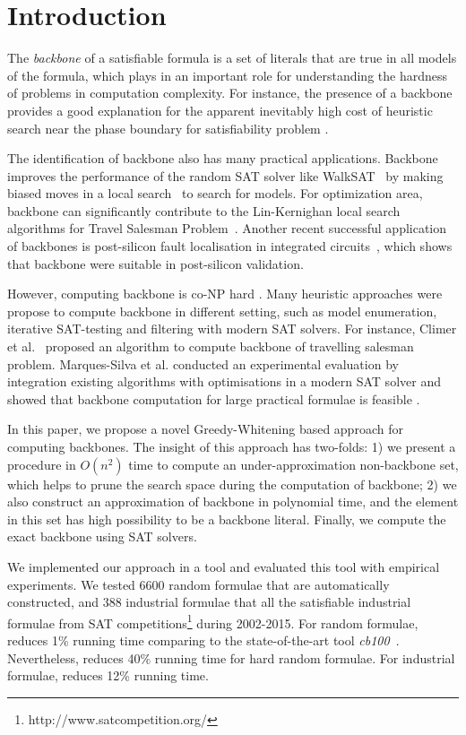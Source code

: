 

\section{Introduction}
The \textit{backbone} of a satisfiable formula is a set of literals that are true in all models of the formula,
which plays in an important role for understanding the hardness of problems in computation complexity.
For instance, the presence of a backbone provides a good explanation for the apparent inevitably high cost of heuristic search near the phase boundary  for satisfiability problem \cite{MZKST99}.

The identification of backbone also has many practical applications. Backbone improves the performance of the random SAT solver like  WalkSAT~\cite{SBK1993} by making biased moves in a local search~\cite{ZWR2003,MAR2007} to search for models. For optimization area,  backbone can significantly contribute to the Lin-Kernighan local search algorithms for Travel Salesman Problem~\cite{ZWL2005}. Another recent successful application of backbones is post-silicon fault localisation in integrated circuits~\cite{ZWSM11,ZWM11}, which shows that backbone were suitable in post-silicon validation.

However, computing backbone is co-NP hard \cite{Jan10}.  Many heuristic approaches were propose to compute backbone in different setting, such as model enumeration, iterative SAT-testing and filtering with modern SAT solvers.
For instance, Climer et al.~\cite{CZ2002} proposed an algorithm to compute backbone of travelling salesman problem.
Marques-Silva et al.  conducted an experimental evaluation by integration existing algorithms with optimisations in a modern SAT solver and showed that backbone computation for large practical formulae is feasible \cite{MJML2010,JLMS12,JLM15}.


In this paper, we propose a novel Greedy-Whitening based approach \tool for computing backbones. The insight of this approach has two-folds: 1) we present a procedure in $O(n^2)$ time to compute an under-approximation non-backbone set, which helps to prune the search space during the computation of backbone; 2) we also construct an approximation of backbone in polynomial time, and the element in this set has high possibility to be a backbone literal.
Finally, we compute the exact backbone using SAT solvers.

We implemented our approach in a tool \tool and evaluated this tool with empirical experiments. We tested 6600 random formulae that are automatically constructed, and 388 industrial formulae that all the satisfiable industrial formulae from SAT competitions\footnote{http://www.satcompetition.org/} during 2002-2015. For random formulae, \tool reduces 1\% running time comparing to the state-of-the-art tool \textit{cb100}~\cite{JLM15}. Nevertheless, \tool reduces 40\% running time for hard random formulae. For industrial formulae, \tool reduces 12\% running time.


